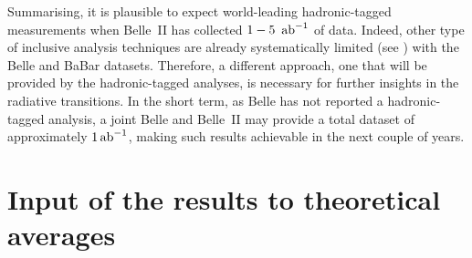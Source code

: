 Summarising, it is plausible to expect world-leading hadronic-tagged \BtoXsgamma measurements when Belle~II has collected $1-5~\mbox{\,ab}^{-1}$ of data.
Indeed, other type of inclusive \BtoXsgamma analysis techniques are already systematically limited (see ) with the Belle and BaBar datasets.
Therefore, a different approach, one that will be provided by the hadronic-tagged analyses, is necessary for further insights in the radiative \BtoXsgamma transitions.
In the short term, as Belle has not reported a hadronic-tagged \BtoXsgamma analysis, a joint Belle and Belle~II may provide a total dataset of approximately $1\mbox{\,ab}^{-1}$, making such results achievable in the next couple of years.

\section{Input of the results to theoretical averages}\label{sec:input_to_theory}

